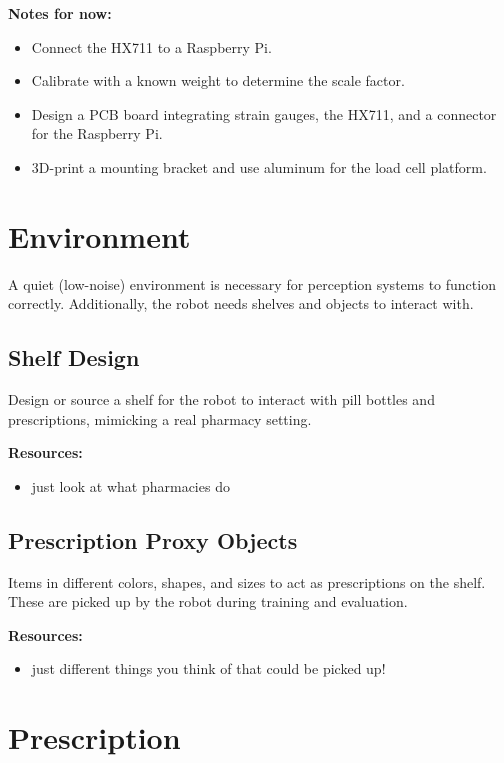 \documentclass[11pt]{article}
\begin{document}
\textbf{Notes for now:}
\begin{itemize}[nosep]
    \item Connect the HX711 to a Raspberry Pi.
    \item Calibrate with a known weight to determine the scale factor.
    \item Design a PCB board integrating strain gauges, the HX711, and a connector for the Raspberry Pi.
    \item 3D-print a mounting bracket and use aluminum for the load cell platform.
\end{itemize}

\section{Environment}
\label{sec:environment}

A quiet (low-noise) environment is necessary for perception systems to function correctly. Additionally, the robot needs shelves and objects to interact with.

\subsection{Shelf Design}
Design or source a shelf for the robot to interact with pill bottles and prescriptions, mimicking a real pharmacy setting.

\textbf{Resources:}
\begin{itemize}[nosep]
    \item just look at what pharmacies do
\end{itemize}

\subsection{Prescription Proxy Objects}
Items in different colors, shapes, and sizes to act as prescriptions on the shelf. These are picked up by the robot during training and evaluation.

\textbf{Resources:}
\begin{itemize}[nosep]
    \item just different things you think of that could be picked up!
\end{itemize}

\section{Prescription}
\label{sec:prescription}
\end{document}
